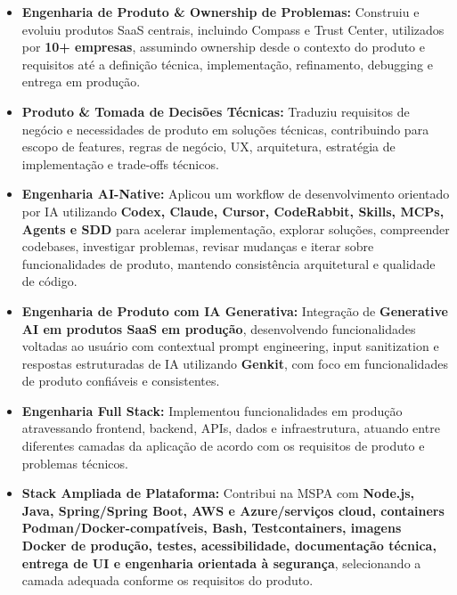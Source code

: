 \documentclass[10pt,a4paper]{article}
\begin{document}
\begin{itemize}

    \item
    \textbf{Engenharia de Produto \& Ownership de Problemas:}
    Construiu e evoluiu produtos SaaS centrais, incluindo Compass e
    Trust Center, utilizados por \textbf{10+ empresas}, assumindo
    ownership desde o contexto do produto e requisitos até a
    definição técnica, implementação, refinamento, debugging e
    entrega em produção.

    \item
    \textbf{Produto \& Tomada de Decisões Técnicas:}
    Traduziu requisitos de negócio e necessidades de produto em
    soluções técnicas, contribuindo para escopo de features,
    regras de negócio, UX, arquitetura, estratégia de
    implementação e trade-offs técnicos.

    \item
    \textbf{Engenharia AI-Native:}
    Aplicou um workflow de desenvolvimento orientado por IA
    utilizando \textbf{Codex, Claude, Cursor, CodeRabbit, Skills,
    MCPs, Agents e SDD} para acelerar implementação, explorar
    soluções, compreender codebases, investigar problemas,
    revisar mudanças e iterar sobre funcionalidades de produto,
    mantendo consistência arquitetural e qualidade de código.

    \item
    \textbf{Engenharia de Produto com IA Generativa:}
    Integração de \textbf{Generative AI em produtos SaaS em
    produção}, desenvolvendo funcionalidades voltadas ao usuário
    com contextual prompt engineering, input sanitization e
    respostas estruturadas de IA utilizando \textbf{Genkit},
    com foco em funcionalidades de produto confiáveis e
    consistentes.

    \item
    \textbf{Engenharia Full Stack:}
    Implementou funcionalidades em produção atravessando
    frontend, backend, APIs, dados e infraestrutura, atuando
    entre diferentes camadas da aplicação de acordo com os
    requisitos de produto e problemas técnicos.

    \item
    \textbf{Stack Ampliada de Plataforma:}
    Contribui na MSPA com \textbf{Node.js, Java, Spring/Spring Boot,
    AWS e Azure/serviços cloud, containers Podman/Docker-compatíveis,
    Bash, Testcontainers, imagens Docker de produção, testes, acessibilidade,
    documentação técnica, entrega de UI e engenharia orientada à segurança},
    selecionando a camada adequada conforme os requisitos do produto.


\end{itemize}
\end{document}
